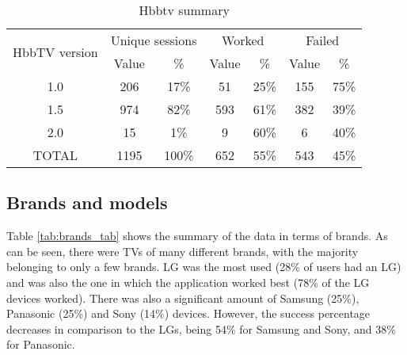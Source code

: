 \begin{table}
	\begin{center}
		\caption{Hbbtv summary}\label{tab:hbbtv_tab}
		\begin{tabular}{||c|c|c|c|c|c|c||}
			\hline
			\multirow{2}{*}{HbbTV version} & \multicolumn{2}{c|}{Unique sessions} & \multicolumn{2}{c|}{Worked} & \multicolumn{2}{c||}{Failed} \\ \cline{2-7} 
			& Value             & \%               & Value        & \%           & Value          & \%             \\ \hline
			1.0                            & 206               & 17\%             & 51           & 25\%         & 155            & 75\%           \\ \hline
			1.5                            & 974               & 82\%             & 593          & 61\%         & 382            & 39\%           \\ \hline
			2.0                            & 15                & 1\%              & 9            & 60\%         & 6              & 40\%           \\ \hline
			TOTAL                          & 1195              & 100\%            & 652          & 55\%        & 543            & 45\%          \\ \hline
		\end{tabular}
	\end{center}
\end{table}

\subsection{Brands and models}\label{brandres}
Table \ref{tab:brands_tab} shows the summary of the data in terms of brands. As can be seen, there were TVs of many different brands, with the majority belonging to only a few brands. LG was the most used (28\% of users had an LG) and was also the one in which the application worked best (78\% of the LG devices worked). There was also a significant amount of Samsung (25\%), Panasonic (25\%) and Sony (14\%) devices. However, the success percentage decreases in comparison to the LGs, being 54\% for Samsung and Sony, and 38\% for Panasonic.

